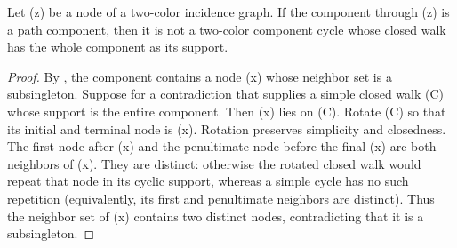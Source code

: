 \begin{helper}
Let (z) be a node of a two-color incidence graph.  If the component through
(z) is a path component, then it is not a two-color component cycle whose
closed walk has the whole component as its support.
\end{helper}
\begin{proof}
By , the component contains a node (x)
whose neighbor set is a subsingleton.  Suppose for a contradiction that
 supplies a simple closed walk (C) whose
support is the entire component.  Then (x) lies on (C).  Rotate (C) so
that its initial and terminal node is (x).  Rotation preserves simplicity
and closedness.  The first node after (x) and the penultimate node before
the final (x) are both neighbors of (x).  They are distinct: otherwise
the rotated closed walk would repeat that node in its cyclic support, whereas
a simple cycle has no such repetition (equivalently, its first and
penultimate neighbors are distinct).  Thus the neighbor set of (x)
contains two distinct nodes, contradicting that it is a subsingleton.
\end{proof}
